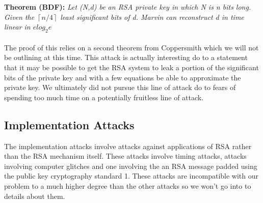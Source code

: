 \documentclass[12pt]{article} %
\begin{document}
\begin{enumerate}
\\\\
\textbf{Theorem (BDF): }\textit{Let (N,d) be an RSA private key in which N is n bits long. Given the $\left\lceil n/4 \right\rceil$ least significant bits of d. Marvin can reconstruct d in time linear in $elog_2e$}
\\\\
The proof of this relies on a second theorem from Coppersmith which we will not be outlining at this time. This attack is actually interesting do to a statement that it may be possible to get the RSA system to leak a portion of the significant bits of the private key and with a few equations be able to approximate the private key. We ultimately did not pursue this line of attack do to fears of spending too much time on a potentially fruitless line of attack. 
\end{enumerate}
\subsection{Implementation Attacks}
The implementation attacks involve attacks against applications of RSA rather than the RSA mechanism itself. These attacks involve timing attacks, attacks involving computer glitches and one involving the an RSA message padded using the public key cryptography standard 1. These attacks are incompatible with our problem to a much higher degree than the other attacks so we won't go into to details about them.
\end{document}
